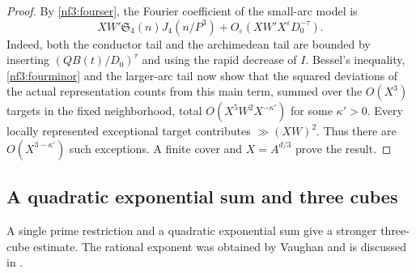 \documentclass[11pt,letterpaper]{article}
\theoremstyle{definition}
\numberwithin{equation}{section}
\begin{document}
\begin{proof}
By \eqref{nf3:fourser}, the Fourier coefficient of the small-arc model is
\[
 XW'\mathfrak S_4(n)J_4(n/P^3)+O_\varepsilon(XW'X^\varepsilon D_0^{-\tau}).
\] Indeed, both the conductor
tail and the archimedean tail are bounded by inserting
$(QB(t)/D_0)^\tau$ and using the rapid decrease of $I$.
Bessel's inequality, \eqref{nf3:fourminor} and the larger-arc tail
now show that the squared deviations of the actual representation
counts from this main term, summed over the $O(X^3)$ targets in the
fixed neighborhood, total $O(X^5W^2X^{-\kappa'})$ for some $\kappa'>0$.
Every locally represented exceptional target contributes $\gg (XW)^2$.
Thus there are $O(X^{3-\kappa'})$ such exceptions. A finite cover
and $X=A^{d/3}$ prove the result.
\end{proof}

\subsection{A quadratic exponential sum and three cubes}\label{nf3:vaughansec}
A single prime restriction and a quadratic exponential sum give a
stronger three-cube estimate. The rational exponent was obtained by
Vaughan \cite{nf3:vaughan85} and is discussed in
\cite[Sect.~3]{nf3:maynard}.
\end{document}
